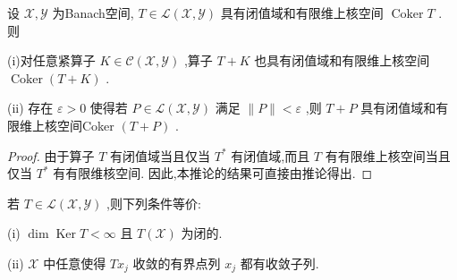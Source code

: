 \documentclass[lang=cn,newtx,10pt,scheme=chinese,thmcnt=chapter]{elegantbook}
\newcommand{\Coker}{\operatorname{Coker}}
\begin{document}
\begin{corollary}
    设 \(\mathcal{X},\mathcal{Y}\) 为Banach空间, \(T \in  \mathcal{L}\left( {\mathcal{X},\mathcal{Y}}\right)\) 具有闭值域和有限维上核空间 \(\Coker T\) . 则

(i)对任意紧算子 \(K \in  \mathcal{C}\left( {\mathcal{X},\mathcal{Y}}\right)\) ,算子 \(T + K\) 也具有闭值域和有限维上核空间 \(\Coker\left( {T + K}\right)\) .

(ii) 存在 \(\varepsilon  > 0\) 使得若 \(P \in  \mathcal{L}\left( {\mathcal{X},\mathcal{Y}}\right)\) 满足 \(\parallel P\parallel  < \varepsilon\) ,则 \(T + P\) 具有闭值域和有限维上核空间Coker \(\left( {T + P}\right)\) .
\end{corollary}
\begin{proof}
    由于算子 \(T\) 有闭值域当且仅当 \({T}^{ * }\) 有闭值域,而且 \(T\) 有有限维上核空间当且仅当 \({T}^{ * }\) 有有限维核空间. 因此,本推论的结果可直接由推论得出.
\end{proof}
\begin{proposition}\label{pro4.2}
         若 \(T \in  \mathcal{L}\left( {\mathcal{X},\mathcal{Y}}\right)\) ,则下列条件等价:

(i) \(\dim \operatorname{Ker}T < \infty\) 且 \(T\left( \mathcal{X}\right)\) 为闭的.

(ii) \(\mathcal{X}\) 中任意使得 \(T{x}_{j}\) 收敛的有界点列 \({x}_{j}\) 都有收敛子列.
\end{proposition}
\end{document}
